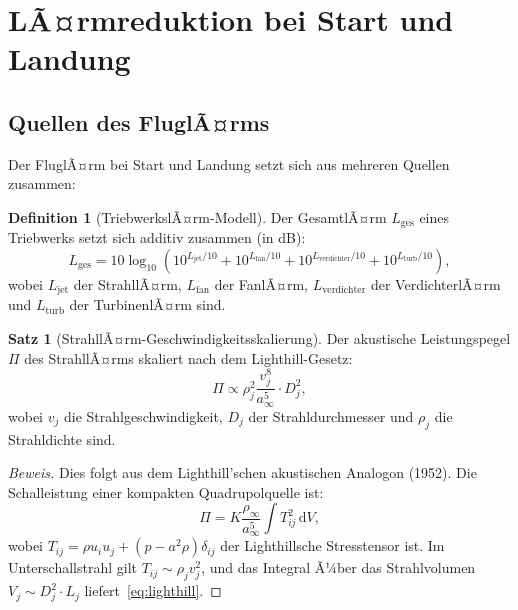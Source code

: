 ﻿\documentclass[12pt,a4paper]{article}
\theoremstyle{definition}
\newtheorem{definition}{Definition}[section]
\newtheorem{satz}{Satz}[section]
\theoremstyle{remark}
\newenvironment{beweis}{\begin{proof}[Beweis]}{\end{proof}}
\newcommand{\dd}{\,\mathrm{d}}
\begin{document}
\section{LÃ¤rmreduktion bei Start und Landung}
\label{sec:startlandung}

\subsection{Quellen des FluglÃ¤rms}

Der FluglÃ¤rm bei Start und Landung setzt sich aus mehreren Quellen zusammen:

\begin{definition}[TriebwerkslÃ¤rm-Modell]
  Der GesamtlÃ¤rm $L_\text{ges}$ eines Triebwerks setzt sich additiv zusammen (in dB):
  \begin{equation}
    L_\text{ges} = 10 \log_{10}\!\left(10^{L_\text{jet}/10} + 10^{L_\text{fan}/10}
                              + 10^{L_\text{verdichter}/10} + 10^{L_\text{turb}/10}\right),
    \label{eq:gesamtlaerm}
  \end{equation}
  wobei $L_\text{jet}$ der StrahllÃ¤rm, $L_\text{fan}$ der FanlÃ¤rm,
  $L_\text{verdichter}$ der VerdichterlÃ¤rm und $L_\text{turb}$ der TurbinenlÃ¤rm sind.
\end{definition}

\begin{satz}[StrahllÃ¤rm-Geschwindigkeitsskalierung]
  \label{satz:strahllÃ¤rm}
  Der akustische Leistungspegel $\Pi$ des StrahllÃ¤rms skaliert nach dem Lighthill-Gesetz:
  \begin{equation}
    \Pi \propto \rho_j^2 \frac{v_j^8}{a_\infty^5} \cdot D_j^2,
    \label{eq:lighthill}
  \end{equation}
  wobei $v_j$ die Strahlgeschwindigkeit, $D_j$ der Strahldurchmesser und $\rho_j$ die
  Strahldichte sind.
\end{satz}

\begin{beweis}
  Dies folgt aus dem Lighthill'schen akustischen Analogon (1952). Die Schalleistung einer
  kompakten Quadrupolquelle ist:
  \begin{equation}
    \Pi = K \frac{\rho_\infty}{a_\infty^5} \int T_{ij}^2 \dd V,
  \end{equation}
  wobei $T_{ij} = \rho u_i u_j + (p - a^2 \rho)\delta_{ij}$ der Lighthillsche Stresstensor
  ist. Im Unterschallstrahl gilt $T_{ij} \sim \rho_j v_j^2$, und das Integral Ã¼ber das
  Strahlvolumen $V_j \sim D_j^2 \cdot L_j$ liefert~\eqref{eq:lighthill}. \qedhere
\end{beweis}
\end{document}
